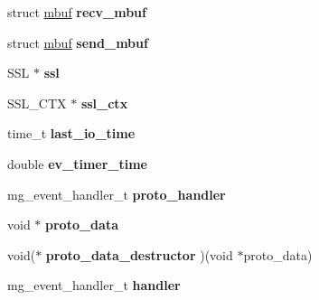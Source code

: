 \begin{DoxyCompactItemize}
\item 
struct \hyperlink{structmbuf}{mbuf} {\bfseries recv\+\_\+mbuf}\hypertarget{structmg__connection_a72adb9aba4bbe59a9bd591de496713b3}{}\label{structmg__connection_a72adb9aba4bbe59a9bd591de496713b3}

\item 
struct \hyperlink{structmbuf}{mbuf} {\bfseries send\+\_\+mbuf}\hypertarget{structmg__connection_a70076f5da9c9d01e77acb3547941671c}{}\label{structmg__connection_a70076f5da9c9d01e77acb3547941671c}

\item 
S\+SL $\ast$ {\bfseries ssl}\hypertarget{structmg__connection_ac376c70a4f827896a0152d704233424b}{}\label{structmg__connection_ac376c70a4f827896a0152d704233424b}

\item 
S\+S\+L\+\_\+\+C\+TX $\ast$ {\bfseries ssl\+\_\+ctx}\hypertarget{structmg__connection_adad6e9c147ed4d84d40793dfb6c3d318}{}\label{structmg__connection_adad6e9c147ed4d84d40793dfb6c3d318}

\item 
time\+\_\+t {\bfseries last\+\_\+io\+\_\+time}\hypertarget{structmg__connection_aaf0f39b26deef84e6c204a176ea1e50a}{}\label{structmg__connection_aaf0f39b26deef84e6c204a176ea1e50a}

\item 
double {\bfseries ev\+\_\+timer\+\_\+time}\hypertarget{structmg__connection_a84d1a7e42f1326c70f61f71e65082dc0}{}\label{structmg__connection_a84d1a7e42f1326c70f61f71e65082dc0}

\item 
mg\+\_\+event\+\_\+handler\+\_\+t {\bfseries proto\+\_\+handler}\hypertarget{structmg__connection_ae6b1f0d002253c0f80371fc5a7bbfc70}{}\label{structmg__connection_ae6b1f0d002253c0f80371fc5a7bbfc70}

\item 
void $\ast$ {\bfseries proto\+\_\+data}\hypertarget{structmg__connection_a7508851a3c070a1357c226781fa92bb7}{}\label{structmg__connection_a7508851a3c070a1357c226781fa92bb7}

\item 
void($\ast$ {\bfseries proto\+\_\+data\+\_\+destructor} )(void $\ast$proto\+\_\+data)\hypertarget{structmg__connection_a834e7757b28379b2ca0b8b6c51d7ba95}{}\label{structmg__connection_a834e7757b28379b2ca0b8b6c51d7ba95}

\item 
mg\+\_\+event\+\_\+handler\+\_\+t {\bfseries handler}\hypertarget{structmg__connection_a1f14bd154357c301cce137c9ac1d1edb}{}\label{structmg__connection_a1f14bd154357c301cce137c9ac1d1edb}


\end{DoxyCompactItemize}
